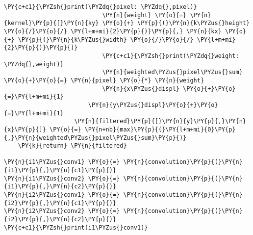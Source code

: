 \begin{tcolorbox}[breakable, size=fbox, boxrule=1pt, pad at break*=1mm,colback=cellbackground, colframe=cellborder]
\begin{Verbatim}[commandchars=\\\{\}]
                            \PY{c+c1}{\PYZsh{}print(\PYZdq{}pixel: \PYZdq{},pixel)}
                            \PY{n}{weight} \PY{o}{=} \PY{n}{kernel}\PY{p}{[}\PY{n}{ky} \PY{o}{+} \PY{p}{(}\PY{n}{k\PYZus{}height} \PY{o}{/}\PY{o}{/} \PY{l+m+mi}{2}\PY{p}{)}\PY{p}{,} \PY{n}{kx} \PY{o}{+} \PY{p}{(}\PY{n}{k\PYZus{}width} \PY{o}{/}\PY{o}{/} \PY{l+m+mi}{2}\PY{p}{)}\PY{p}{]}
                            \PY{c+c1}{\PYZsh{}print(\PYZdq{}weight: \PYZdq{},weight)}
                            \PY{n}{weighted\PYZus{}pixel\PYZus{}sum} \PY{o}{+}\PY{o}{=} \PY{n}{pixel} \PY{o}{*} \PY{n}{weight}
                            \PY{n}{x\PYZus{}displ} \PY{o}{+}\PY{o}{=}\PY{l+m+mi}{1}
                        \PY{n}{y\PYZus{}displ}\PY{o}{+}\PY{o}{=}\PY{l+m+mi}{1}
                    \PY{n}{filtered}\PY{p}{[}\PY{n}{y}\PY{p}{,}\PY{n}{x}\PY{p}{]} \PY{o}{=} \PY{n+nb}{max}\PY{p}{(}\PY{l+m+mi}{0}\PY{p}{,}\PY{n}{weighted\PYZus{}pixel\PYZus{}sum}\PY{p}{)}
    \PY{k}{return} \PY{n}{filtered}

\PY{n}{i1\PYZus{}conv1} \PY{o}{=} \PY{n}{convolution}\PY{p}{(}\PY{n}{i1}\PY{p}{,}\PY{n}{c1}\PY{p}{)}
\PY{n}{i1\PYZus{}conv2} \PY{o}{=} \PY{n}{convolution}\PY{p}{(}\PY{n}{i1}\PY{p}{,}\PY{n}{c2}\PY{p}{)}
\PY{n}{i2\PYZus{}conv1} \PY{o}{=} \PY{n}{convolution}\PY{p}{(}\PY{n}{i2}\PY{p}{,}\PY{n}{c1}\PY{p}{)}
\PY{n}{i2\PYZus{}conv2} \PY{o}{=} \PY{n}{convolution}\PY{p}{(}\PY{n}{i2}\PY{p}{,}\PY{n}{c2}\PY{p}{)}
\PY{c+c1}{\PYZsh{}print(i1\PYZus{}conv1)}


\end{Verbatim}
\end{tcolorbox}
